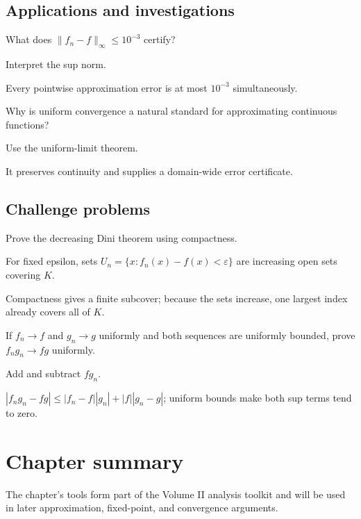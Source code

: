 \subsection*{Applications and investigations}

\begin{exercise}\label{exr:ii11-expand-13}
What does \(\|f_n-f\|_\infty\le10^{-3}\) certify?
\end{exercise}
\begin{hint}
Interpret the sup norm.
\end{hint}
\begin{solution}
Every pointwise approximation error is at most \(10^{-3}\) simultaneously.
\end{solution}

\begin{exercise}\label{exr:ii11-expand-14}
Why is uniform convergence a natural standard for approximating continuous functions?
\end{exercise}
\begin{hint}
Use the uniform-limit theorem.
\end{hint}
\begin{solution}
It preserves continuity and supplies a domain-wide error certificate.
\end{solution}

\subsection*{Challenge problems}

\begin{exercise}\label{exr:ii11-expand-15}
Prove the decreasing Dini theorem using compactness.
\end{exercise}
\begin{hint}
For fixed epsilon, sets \(U_n=\{x:f_n(x)-f(x)<\varepsilon\}\) are increasing open sets covering \(K\).
\end{hint}
\begin{solution}
Compactness gives a finite subcover; because the sets increase, one largest index already covers all of \(K\).
\end{solution}

\begin{exercise}\label{exr:ii11-expand-16}
If \(f_n\to f\) and \(g_n\to g\) uniformly and both sequences are uniformly bounded, prove \(f_ng_n\to fg\) uniformly.
\end{exercise}
\begin{hint}
Add and subtract \(fg_n\).
\end{hint}
\begin{solution}
\(|f_ng_n-fg|\le|f_n-f||g_n|+|f||g_n-g|\); uniform bounds make both sup terms tend to zero.
\end{solution}
\section*{Chapter summary}
The chapter's tools form part of the Volume II analysis toolkit and will be used in later approximation, fixed-point, and convergence arguments.
